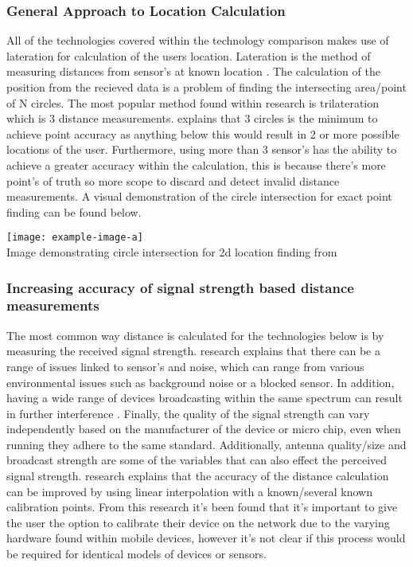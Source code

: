 \subsubsection{General Approach to Location Calculation}
All of the technologies covered within the technology comparison makes use of lateration for calculation of the users location. Lateration is the method of measuring distances from sensor's at known location \citetemp. The calculation of the position from the recieved data is a problem of finding the intersecting area/point of N circles. The most popular method found within research is trilateration which is 3 distance measurements. \citetemp explains that 3 circles is the minimum to achieve point accuracy as anything below this would result in 2 or more possible locations of the user. Furthermore, using more than 3 sensor's has the ability to achieve a greater accuracy within the calculation, this is because there's more point's of truth so more scope to discard and detect invalid distance measurements. A visual demonstration of the circle intersection for exact point finding can be found below.

\begin{center}
	\texttt{[image: example-image-a]}\\
	Image demonstrating circle intersection for 2d location finding from \citetemp
\end{center}

\subsubsection{Increasing accuracy of signal strength based distance measurements}
The most common way distance is calculated for the technologies below is by measuring the received signal strength. \citetemp research explains that there can be a range of issues linked to sensor's and noise, which can range from various environmental issues such as background noise or a blocked sensor. In addition, having a wide range of devices broadcasting within the same spectrum can result in further interference \citetemp. Finally, the quality of the  signal strength can vary independently based on the manufacturer of the device or micro chip, even when running they adhere to the same standard. Additionally, antenna quality/size and broadcast strength are some of the variables that can also effect the perceived signal strength. \citetemp research explains that the accuracy of the distance calculation can be improved by using linear interpolation with a known/several known calibration points. From this research it's been found that it's important to give the user the option to calibrate their device on the network due to the varying hardware found within mobile devices, however it's not clear if this process would be required for identical models of devices or sensors.\\

